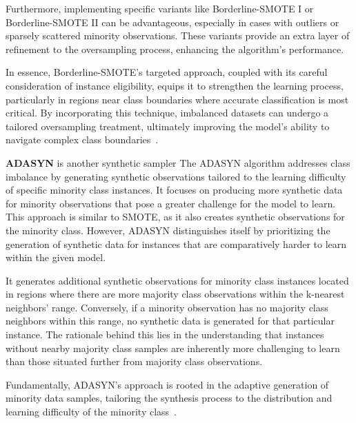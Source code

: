 Furthermore, implementing specific variants like Borderline-SMOTE I or Borderline-SMOTE II can be advantageous, especially in cases with outliers or sparsely scattered minority observations. These variants provide an extra layer of refinement to the oversampling process, enhancing the algorithm's performance.

In essence, Borderline-SMOTE's targeted approach, coupled with its careful consideration of instance eligibility, equips it to strengthen the learning process, particularly in regions near class boundaries where accurate classification is most critical. By incorporating this technique, imbalanced datasets can undergo a tailored oversampling treatment, ultimately improving the model's ability to navigate complex class boundaries~\cite{Nguyen2009,Gupta2018,Brandt2020}.




\textbf{ADASYN} is another synthetic sampler 
The ADASYN algorithm addresses class imbalance by generating synthetic observations tailored to the learning difficulty of specific minority class instances. It focuses on producing more synthetic data for minority observations that pose a greater challenge for the model to learn. This approach is similar to SMOTE, as it also creates synthetic observations for the minority class. However, ADASYN distinguishes itself by prioritizing the generation of synthetic data for instances that are comparatively harder to learn within the given model.

It generates additional synthetic observations for minority class instances located in regions where there are more majority class observations within the k-nearest neighbors' range. Conversely, if a minority observation has no majority class neighbors within this range, no synthetic data is generated for that particular instance. The rationale behind this lies in the understanding that instances without nearby majority class samples are inherently more challenging to learn than those situated further from majority class observations.

Fundamentally, ADASYN's approach is rooted in the adaptive generation of minority data samples, tailoring the synthesis process to the distribution and learning difficulty of the minority class~\cite{Brandt2020, He2008}.









